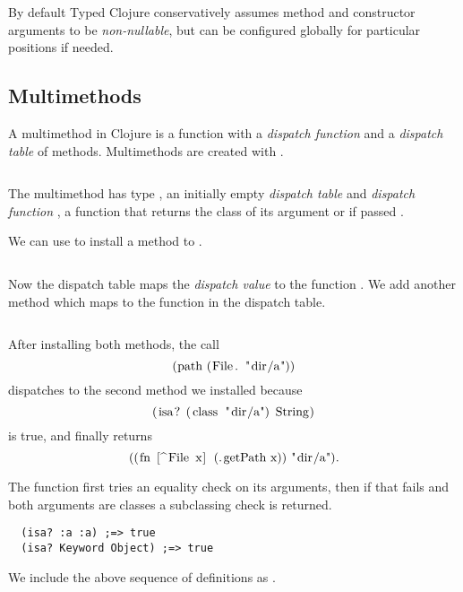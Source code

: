 By default Typed Clojure conservatively assumes method and constructor arguments to be \emph{non-nullable},
but can be configured globally for particular positions if needed.

\subsection{Multimethods}

\label{sec:multioverview}

A multimethod in Clojure is a function with a \emph{dispatch
function} and a \emph{dispatch table} of methods. Multimethods are created with {}.
\inputminted[firstline=5,lastline=6]{clojure}{code/demo/src/demo/rep.clj}
The multimethod  has type , an initially empty \emph{dispatch table}
and \emph{dispatch function} , a function that
returns the class of its argument or  if passed .

We can use {} to install a method to .
\inputminted[firstline=7,lastline=7]{clojure}{code/demo/src/demo/rep.clj}
Now the dispatch table maps
the \emph{dispatch value}  to the function
. 
We add another method
which maps
 to the function
in the dispatch table.
\inputminted[firstline=8,lastline=8]{clojure}{code/demo/src/demo/rep.clj}

After installing both methods, the call 
$$
\clj{(path (File. "dir/a"))}
$$
dispatches to the second method we installed because
$$
\clj{(isa? (class "dir/a") String)}
$$
is true, and finally returns 
$$
\clj{((fn [^File x] (.getPath x)) "dir/a")}.
$$

The  function first tries an equality check
on its arguments, then if that fails
and both arguments are classes a subclassing
check is returned.
\begin{verbatim}
  (isa? :a :a) ;=> true
  (isa? Keyword Object) ;=> true
\end{verbatim}

We include the above sequence of definitions as .

\begin{Code}
\begin{exmp}
\inputminted[firstline=5,lastline=10]{clojure}{code/demo/src/demo/rep.clj}
\label{example:rep}
\end{exmp}
\end{Code}

